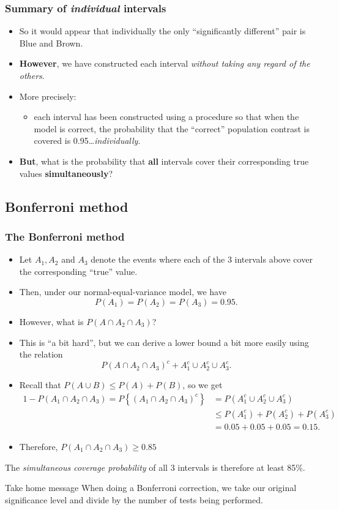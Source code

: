 \documentclass[a4paper]{article}
\begin{document}
\subsubsection{Summary of \textit{individual} intervals}
\begin{itemize}
	\item So it would appear that individually the only ``significantly different'' pair is Blue and Brown.
	\item \textbf{However}, we have constructed each interval \textit{without taking any regard of the others}.
	\item More precisely:
	\begin{itemize}
		\item each interval has been constructed using a procedure so that when the model is correct, the probability that the ``correct'' population contrast is covered is 0.95\dots \textit{individually}.
	\end{itemize}
	\item \textbf{But}, what is the probability that \textbf{all} intervals cover their corresponding true values \textbf{simultaneously}?
\end{itemize}
\subsection{Bonferroni method}
\subsubsection{The Bonferroni method}
\begin{itemize}
	\item Let \( A_1, A_2 \) and \( A_3 \) denote the events where each of the 3 intervals above cover the corresponding ``true'' value.
	\item Then, under our normal-equal-variance model, we have
	\[
		P(A_1)=P(A_2)=P(A_3)=0.95.
	\]
	\item However, what is \( P(A \cap A_2 \cap A_3) \)?
	\item This is ``a bit hard'', but we can derive a lower bound a bit more easily using the relation
	\[
		P(A \cap A_2 \cap A_3)^{c} + A^{c}_{1} \cup A^{c}_{2} \cup A^{c}_{3}.
	\]
	\item Recall that \( P(A \cup B) \leq P(A) + P(B) \), so we get
	\begin{align*}
		1- P \left( A_1\cap A_2\cap A_3 \right) = P\left\{ \left( A_1\cap A_2\cap A_3 \right)^c\right\}&= P\left(A_1^c\cup A_2^c\cup A_3^c\right) \\
		&\leq P(A_1^c)+P(A_2^c)+P(A_3^c)\\
		&= 0.05+0.05+0.05=0.15.
	\end{align*}
	\item Therefore, \( P(A_1 \cap A_2 \cap A_3) \geq 0.85 \) 
\end{itemize}
The \textit{simultaneous coverage probability} of all 3 intervals is therefore at least 85\%.
\begin{bluebox}{Take home message}
	When doing a Bonferroni correction, we take our original significance level and divide by the number of tests being performed.
\end{bluebox}
\end{document}
